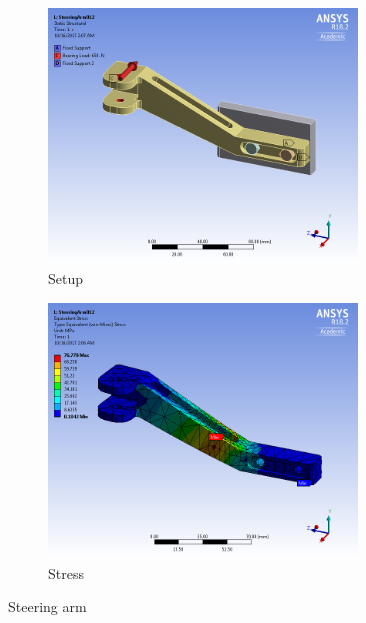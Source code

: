 \documentclass[10pt]{article}
\begin{document}
\begin{figure}[H]
\centering
\begin{subfigure}[b]{.48\textwidth}
\centering
\includegraphics[width=0.9\textwidth]{figures/fea/parts/MS00074-SteeringArm-Setup}
\caption{Setup}
\end{subfigure}
\begin{subfigure}[b]{.48\textwidth}
\centering
\includegraphics[width=0.9\textwidth]{figures/fea/parts/MS00074-SteeringArm-Stress}
\caption{Stress}
\end{subfigure}
\caption{Steering arm}
\label{fig:MS00074-SteeringArm}
\end{figure}
\end{document}
